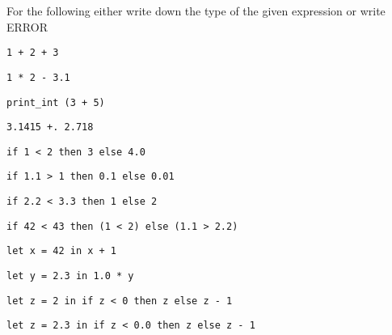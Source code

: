 

\renewcommand\AUTHOR{nweadick1@cougars.ccis.edu} %


\topmattertwo

For the following either write down the type of the given expression
or write ERROR

\nextq
\verb!1 + 2 + 3!
\dotfill
{}

\nextq
\verb!1 * 2 - 3.1!
\dotfill
{}

\nextq
\verb!print_int (3 + 5)!
\dotfill
{}

\nextq
\verb!3.1415 +. 2.718!
\dotfill
{}

\nextq
\verb!if 1 < 2 then 3 else 4.0!
\dotfill
{}

\nextq
\verb!if 1.1 > 1 then 0.1 else 0.01!
\dotfill
{}

\nextq
\verb!if 2.2 < 3.3 then 1 else 2!
\dotfill
{}

\nextq
\verb!if 42 < 43 then (1 < 2) else (1.1 > 2.2)!
\dotfill
{}

\nextq
\verb!let x = 42 in x + 1!
\dotfill
{}

\nextq
\verb!let y = 2.3 in 1.0 * y!
\dotfill
{}

\nextq
\verb!let z = 2 in if z < 0 then z else z - 1!
\dotfill
{}

\nextq
\verb!let z = 2.3 in if z < 0.0 then z else z - 1!
\dotfill
{}

\newpage



